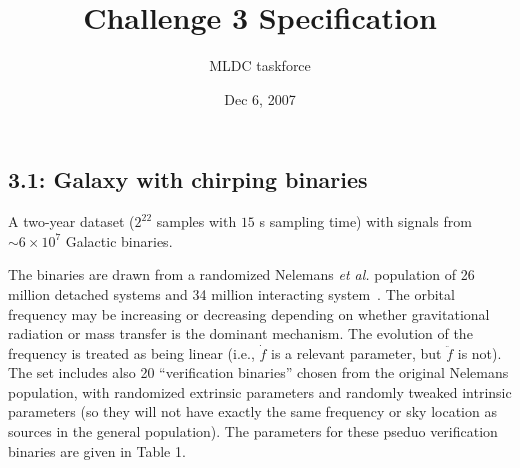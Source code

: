 \documentclass[11pt]{article}
\title{Challenge 3 Specification}
\author{MLDC taskforce}
\date{Dec 6, 2007}
\begin{document}
\maketitle

\subsection*{3.1: Galaxy with chirping binaries}

A two-year dataset ($2^{22}$ samples with $15$ s sampling time) with signals from $\sim 6 \times 10^7$ Galactic binaries.

The binaries are drawn from a randomized Nelemans {\it et al.} population of 26 million detached systems and 34 million
interacting system~\cite{nyz01,nyz04}. The orbital frequency may be increasing or decreasing depending on whether gravitational
radiation or mass transfer is the dominant mechanism. The evolution of the frequency is treated as being linear (i.e., $\dot{f}$
is a relevant parameter, but $\ddot{f}$ is not). The set includes also 20 ``verification binaries''
chosen from the original Nelemans population, with randomized extrinsic parameters and randomly tweaked intrinsic
parameters (so they will not have exactly the same frequency or sky location as sources in the general population).
The parameters for these pseduo verification binaries are given in Table 1.
\end{document}
